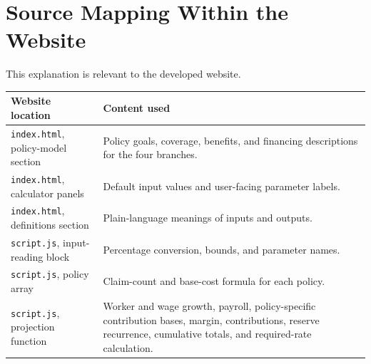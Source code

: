 \section{Source Mapping Within the Website}

This explanation is relevant to the developed website.

\begin{longtable}{>{\raggedright\arraybackslash}p{} >{\raggedright\arraybackslash}p{}}
\toprule
\textbf{Website location} & \textbf{Content used} \\
\midrule
\texttt{index.html}, policy-model section & Policy goals, coverage, benefits, and financing descriptions for the four branches. \\
\texttt{index.html}, calculator panels & Default input values and user-facing parameter labels. \\
\texttt{index.html}, definitions section & Plain-language meanings of inputs and outputs. \\
\texttt{script.js}, input-reading block & Percentage conversion, bounds, and parameter names. \\
\texttt{script.js}, policy array & Claim-count and base-cost formula for each policy. \\
\texttt{script.js}, projection function & Worker and wage growth, payroll, policy-specific contribution bases, margin, contributions, reserve recurrence, cumulative totals, and required-rate calculation. \\
\bottomrule
\end{longtable}
